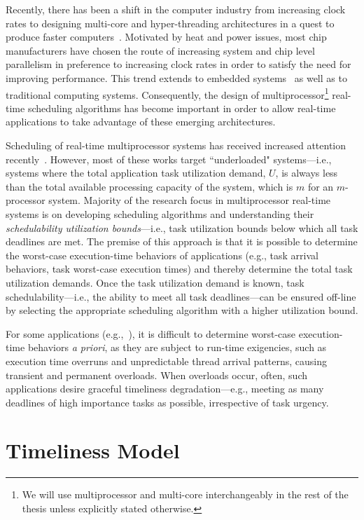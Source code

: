 \documentclass[12pt,dvips]{report}
\begin{document}
Recently, there has been a shift in the computer industry from increasing clock rates to designing multi-core and hyper-threading architectures in a quest to produce faster computers~\cite{sutterlunch}. Motivated by heat and power issues, most chip manufacturers have chosen the route of increasing system and chip level parallelism in preference to increasing clock rates in order to satisfy the need for improving performance. This trend extends to embedded systems~\cite{embeddedmulti} as well as to traditional computing systems. Consequently, the design of multiprocessor\footnote{We will use multiprocessor and multi-core interchangeably in the rest of the thesis unless explicitly stated otherwise.} 
real-time scheduling algorithms has become important in order to allow real-time applications to take advantage of these emerging architectures.

Scheduling of real-time multiprocessor systems has received increased attention recently~\cite{Carpenter04acategorization}. However, most of these works target ``underloaded" systems---i.e., systems where the total application task utilization demand, $U$, is always less than the total available processing capacity of the system, which is $m$ for an $m$-processor system. Majority of the research focus in multiprocessor real-time systems is on developing scheduling algorithms and understanding their \textit{schedulability utilization bounds}---i.e., task utilization bounds below which all task deadlines are  met. The premise of this approach is that it is possible to determine the worst-case execution-time behaviors of applications (e.g., task arrival behaviors, task worst-case execution times) and thereby determine the total task utilization demands. Once the task utilization demand is known, task schedulability---i.e., the ability to meet all task deadlines---can be ensured off-line by selecting the appropriate scheduling algorithm with a higher utilization bound.

For some applications (e.g.,~\cite{Wishper,Clark_anadaptive,multimedia}), it is difficult to determine worst-case  execution-time behaviors \textit{a priori}, as they are subject to run-time exigencies, such as execution time overruns and unpredictable thread arrival patterns, causing transient and permanent overloads. When overloads occur, often, such applications desire graceful timeliness degradation---e.g., meeting as many deadlines of high importance tasks as possible, irrespective of task urgency. 

\section{Timeliness Model}
\end{document}
